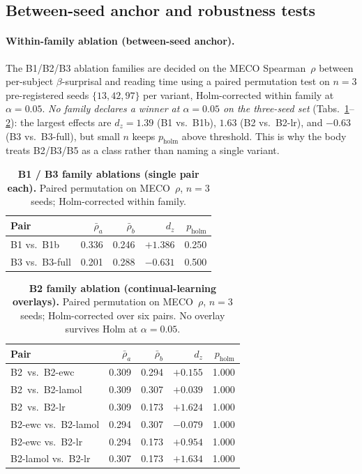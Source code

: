 \subsection{Between-seed anchor and robustness tests}\label{sec:sig-robustness}
 
\paragraph{Within-family ablation (between-seed anchor).} The B1/B2/B3 ablation families are decided on the MECO Spearman~$\rho$ between per-subject $\beta$-surprisal and reading time using a paired permutation test on $n=3$ pre-registered seeds $\{13,42,97\}$ per variant, Holm-corrected within family at $\alpha{=}0.05$. \emph{No family declares a winner at $\alpha{=}0.05$ on the three-seed set} (Tabs.~\ref{tab:sig_B1}--\ref{tab:sig_B3}): the largest effects are $d_z=1.39$ (B1 vs.\ B1b), $1.63$ (B2 vs.\ B2-lr), and $-0.63$ (B3 vs.\ B3-full), but small $n$ keeps $p_{\mathrm{holm}}$ above threshold. This is why the body treats B2/B3/B5 as a class rather than naming a single variant.
 
\begin{table}[!ht]
  \centering \small
  \caption{\textbf{B1 / B3 family ablations (single pair each).} Paired permutation on MECO~$\rho$, $n=3$ seeds; Holm-corrected within family.}
  \label{tab:sig_B1}
  \begin{tabular}{lrrrr}
    \toprule
    Pair & $\bar\rho_a$ & $\bar\rho_b$ & $d_z$ & $p_{\mathrm{holm}}$ \\
    \midrule
    B1 vs.\ B1b     & 0.336 & 0.246 & $+1.386$ & 0.250 \\
    B3 vs.\ B3-full & 0.201 & 0.288 & $-0.631$ & 0.500 \\
    \bottomrule
  \end{tabular}
\end{table}
 
\begin{table}[!ht]
  \centering \small
  \caption{\textbf{B2 family ablation (continual-learning overlays).} Paired permutation on MECO~$\rho$, $n=3$ seeds; Holm-corrected over six pairs. No overlay survives Holm at $\alpha{=}0.05$.}
  \label{tab:sig_B3}
  \begin{tabular}{lrrrr}
    \toprule
    Pair & $\bar\rho_a$ & $\bar\rho_b$ & $d_z$ & $p_{\mathrm{holm}}$ \\
    \midrule
    B2 \,vs.\ B2-ewc      & 0.309 & 0.294 & $+0.155$ & 1.000 \\
    B2 \,vs.\ B2-lamol    & 0.309 & 0.307 & $+0.039$ & 1.000 \\
    B2 \,vs.\ B2-lr       & 0.309 & 0.173 & $+1.624$ & 1.000 \\
    B2-ewc vs.\ B2-lamol  & 0.294 & 0.307 & $-0.079$ & 1.000 \\
    B2-ewc vs.\ B2-lr     & 0.294 & 0.173 & $+0.954$ & 1.000 \\
    B2-lamol vs.\ B2-lr   & 0.307 & 0.173 & $+1.634$ & 1.000 \\
    \bottomrule
  \end{tabular}
\end{table}
 
